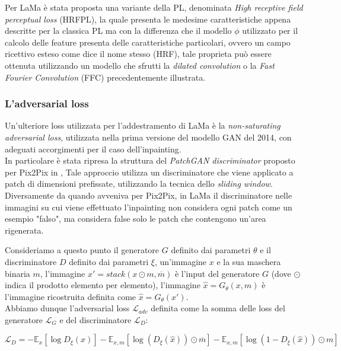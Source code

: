 Per LaMa è stata proposta una variante della PL, denominata \textit{High receptive field perceptual loss} (HRFPL), la quale
presenta le medesime caratteristiche appena descritte per la classica PL ma con la differenza che il modello $\phi$ utilizzato
per il calcolo delle feature presenta delle caratteristiche particolari, ovvero un campo ricettivo esteso come dice il nome stesso (HRF),
tale proprieta può essere ottenuta utilizzando un modello che sfrutti la \textit{dilated convolution} o la \textit{Fast Fourier Convolution} (FFC)
precedentemente illustrata.

\subsubsection{L'adversarial loss}
Un'ulteriore loss utilizzata per l'addestramento di LaMa è la \textit{non-saturating adversarial loss}, utilizzata 
nella prima versione del modello GAN del 2014, con adeguati accorgimenti per il caso dell'inpainting.\\
In particolare è stata ripresa la struttura del \textit{PatchGAN discriminator} proposto per Pix2Pix in \cite{isola2018imagetoimage},
Tale approccio utilizza un discriminatore che viene applicato a patch di dimensioni prefissate, utilizzando la tecnica dello \textit{sliding window}.
Diversamente da quando avveniva per Pix2Pix, in LaMa il discriminatore nelle immagini su cui viene effettuato l'inpainting non considera ogni
patch come un esempio "falso", ma considera false solo le patch che contengono un'area rigenerata.

Consideriamo a questo punto il generatore $G$ definito dai parametri $\theta$ e il discriminatore $D$ definito dai parametri $\xi$,
un'immagine $x$ e la sua maschera binaria $m$, l'immagine $x'=stack(x \odot m, \overline{m})$ è l'input del generatore $G$ 
(dove $\odot$ indica il prodotto elemento per elemento), l'immagine $\hat{x} = G_{\theta}(x, m)$ è l'immagine ricostruita definita 
come $\hat{x} = G_{\theta}(x')$.\\
Abbiamo dunque l'adversarial loss $\mathcal{L}_{adv}$ definita come la somma delle loss del generatore $\mathcal{L}_{G}$ 
e del discriminatore $\mathcal{L}_{D}$:

\begin{equation}
    \label{eq:lama_adv_loss_D}
    \mathcal{L}_{D} = - \mathbb{E}_{x} \left[ \log D_{\xi}(x) \right] - \mathbb{E}_{x, m} \left[ \log \left(D_{\xi}(\hat{x}) \right) \odot \overline{m} \right]
    - \mathbb{E}_{x, m} \left[ \log \left( 1 - D_{\xi}(\hat{x})\right) \odot m \right]
\end{equation}

